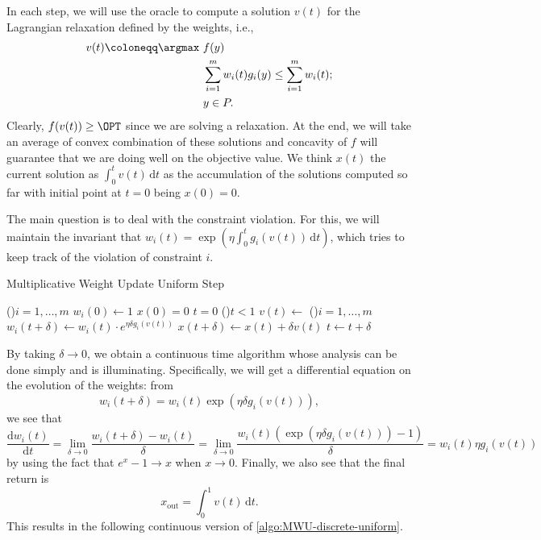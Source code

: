 In each step, we will use the oracle to compute a solution \(v(t)\) for the Lagrangian relaxation defined by the weights, i.e.,
\[
	\begin{aligned}
		v(t) \coloneqq \argmax~ & f(y)                                                      \\
		                        & \sum_{i=1}^{m} w_i(t) g_i(y) \leq \sum_{i=1}^{m} w_i(t) ; \\
		                        & y\in P.
	\end{aligned}
\]
Clearly, \(f(v(t)) \geq \OPT\) since we are solving a relaxation. At the end, we will take an average of convex combination of these solutions and concavity of \(f\) will guarantee that we are doing well on the objective value. We think \(x(t)\) the current solution as \(\int_{0}^{t} v(t) \,\mathrm{d}t \) as the accumulation of the solutions computed so far with initial point at \(t=0\) being \(x(0) = 0\).

The main question is to deal with the constraint violation. For this, we will maintain the invariant that \(w_i(t) = \exp (\eta \int_{0}^{t} g_i(v(t)) \,\mathrm{d}t )\), which tries to keep track of the violation of constraint \(i\).

\begin{algorithm}[H]\label{algo:MWU-discrete-uniform}
	\DontPrintSemicolon{}
	\caption{Multiplicative Weight Update Uniform Step}
	\BlankLine

	\For(){\(i = 1, \dots , m\)}{
		\(w_i(0) \gets 1\)\;
	}
	\(x(0) = 0 \)
	\(t = 0\)\;
	\;
	\While(){\(t < 1\)}{
	\(v(t) \gets\)\;
	\For(){\(i = 1, \dots , m\)}{
		\(w_i(t+\delta ) \gets w_i(t) \cdot e^{\eta \delta g_i(v (t))}\)\;
	}
	\(x (t+\delta ) \gets x (t) + \delta v (t)\)\;
	\(t \gets t + \delta \)\;
	}
	\;
\end{algorithm}

By taking \(\delta \to 0\), we obtain a continuous time algorithm whose analysis can be done simply and is illuminating. Specifically, we will get a differential equation on the evolution of the weights: from
\[
	w_i(t+\delta )
	= w_i(t) \exp (\eta \delta g_i(v(t))),
\]
we see that
\[
	\frac{\mathrm{d}w_i(t)}{\mathrm{d}t}
	= \lim_{\delta \to 0} \frac{w_i(t+\delta ) - w_i(t)}{\delta }
	= \lim_{\delta \to 0} \frac{w_i(t) (\exp (\eta \delta g_i(v(t))) - 1)}{\delta }
	= w_i(t) \eta g_i(v(t))
\]
by using the fact that \(e^x -1 \to x\) when \(x \to 0\). Finally, we also see that the final return is
\[
	x_{\text{out} }
	= \int_{0}^{1} v(t) \,\mathrm{d}t .
\]
This results in the following continuous version of \autoref{algo:MWU-discrete-uniform}.

